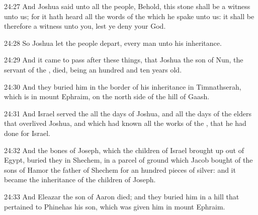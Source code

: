 24:27 And Joshua said unto all the people, Behold, this stone shall be a witness unto us; for it hath heard all the words of the \LORD which he spake unto us: it shall be therefore a witness unto you, lest ye deny your God.

24:28 So Joshua let the people depart, every man unto his inheritance.

24:29 And it came to pass after these things, that Joshua the son of Nun, the servant of the \LORD, died, being an hundred and ten years old.

24:30 And they buried him in the border of his inheritance in Timnathserah, which is in mount Ephraim, on the north side of the hill of Gaash.

24:31 And Israel served the \LORD all the days of Joshua, and all the days of the elders that overlived Joshua, and which had known all the works of the \LORD, that he had done for Israel.

24:32 And the bones of Joseph, which the children of Israel brought up out of Egypt, buried they in Shechem, in a parcel of ground which Jacob bought of the sons of Hamor the father of Shechem for an hundred pieces of silver: and it became the inheritance of the children of Joseph.

24:33 And Eleazar the son of Aaron died; and they buried him in a hill that pertained to Phinehas his son, which was given him in mount Ephraim.

